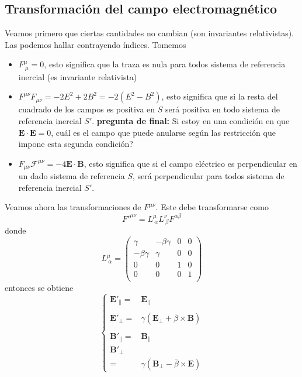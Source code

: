 \subsection{Transformación del campo electromagnético}
Veamos primero que ciertas cantidades no cambian (son invariantes relativistas). Las podemos hallar contrayendo índices. Tomemos
\begin{itemize}
    \item $F^{\mu}_{~\mu} = 0$, esto significa que la traza es nula para todos sistema de referencia inercial (es invariante relativista)
    \item $F^{\mu\nu}F_{\mu\nu} = -2E^{2} + 2B^{2} = -2(E^{2}-B^{2})$, esto significa que si la resta del cuadrado de los campos es positiva en $S$ será positiva en todo sistema de referencia inercial $S'$. \textbf{pregunta de final:} Si estoy en una condición en que $\textbf{E}\cdot \textbf{E} = 0$, cuál es el campo que puede anularse según las restricción que impone esta segunda condición?
    \item $F_{\mu\nu}\mathcal{F}^{\mu\nu} = -4\textbf{E}\cdot \textbf{B}$, esto significa que si el campo eléctrico es perpendicular en un dado sistema de referencia $S$, será perpendicular para todos sistema de referencia inercial $S'$. 
\end{itemize}
Veamos ahora las transformaciones de $F^{\mu\nu}$. Este debe transformarse como
\begin{equation*}
    F'^{\mu\nu} = L^{\mu}_{~\alpha}L^{\nu}_{~\beta}F^{\alpha \beta}
\end{equation*}
donde 
\begin{equation*}
    L^{\mu}_{~\alpha}
    =
    \left(
        \begin{matrix}
            \gamma          & -\beta \gamma & 0 & 0\\
            -\beta \gamma   & \gamma        & 0 & 0\\
            0               & 0             & 1 & 0\\
            0               & 0             & 0 & 1\\
        \end{matrix}
    \right)
\end{equation*}
entonces se obtiene
\begin{equation*}
    \left\{
        \begin{array}{ll}
            \textbf{E}'_{\parallel} 
            = &\textbf{E}_{\parallel}\\
            &\\
            \textbf{E}'_{\perp} 
            = &\gamma(\textbf{E}_{\perp} 
            + \bar{\beta} \times \textbf{B})\\
            &\\
            \textbf{B}'_{\parallel} 
            = &\textbf{B}_{\parallel}\\
            \textbf{B}'_{\perp} 
            &\\
            = &\gamma(\textbf{B}_{\perp} 
            - \bar{\beta}\times\textbf{E})
        \end{array}
    \right.
\end{equation*}
